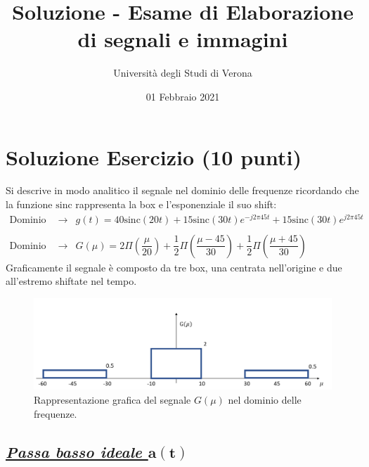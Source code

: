 \documentclass[a4paper]{article}
\begin{document}
	\author{Università degli Studi di Verona}
	\title{Soluzione - Esame di Elaborazione di segnali e immagini}
	\date{{\Large 01 Febbraio 2021}}
	\maketitle
	
	\section{Soluzione Esercizio (10 punti)}
	
	Si descrive in modo analitico il segnale nel dominio delle frequenze ricordando che la funzione $\mathrm{sinc}$ rappresenta la box e l'esponenziale il suo shift:
	\begin{equation*}
		\begin{array}{lll}
			\text{Dominio nel tempo} 		& \longrightarrow & g\left(t\right) = 40\mathrm{sinc}\left(20t\right) + 15\mathrm{sinc}\left(30t\right) e^{-j 2 \pi 45 t} + 15\mathrm{sinc}\left(30t\right) e^{j 2 \pi 45 t} \\
			\\
			\text{Dominio nelle frequenze} 	& \longrightarrow & G\left(\mu\right) = 2\Pi\left(\dfrac{\mu}{20}\right) + \dfrac{1}{2}\Pi\left(\dfrac{\mu - 45}{30}\right) + \dfrac{1}{2}\Pi\left(\dfrac{\mu + 45}{30}\right)
		\end{array}
	\end{equation*}
	Graficamente il segnale è composto da tre box, una centrata nell'origine e due all'estremo shiftate nel tempo.
	\begin{figure}[!htp]
		\centering
		\includegraphics[width=\textwidth]{img/fig_1.png}
		\caption*{Rappresentazione grafica del segnale $G\left(\mu\right)$ nel dominio delle frequenze.}
	\end{figure}\newpage

	\subsection*{\textcolor{Green4}{\emph{\underline{Passa basso ideale $\boldsymbol{a\left(t\right)}$}}}}
	
\end{document}
